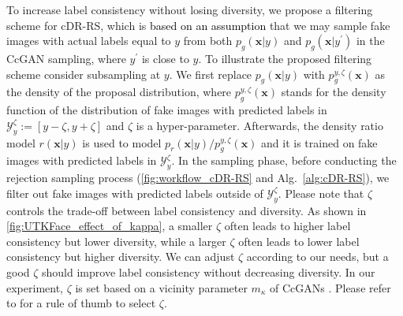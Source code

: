 \documentclass[final,12pt, 3p,times]{elsarticle}
\def\rev#1{\textcolor{black}{#1}}
\begin{document}
To increase label consistency without losing diversity, we propose a filtering scheme for cDR-RS, which is \rev{based on an assumption} that we may sample fake images with actual labels equal to $y$ from both $p_g(\bm{x}|y)$ and $p_g(\bm{x}|y^\prime)$ in the CcGAN sampling, where $y^\prime$ is close to $y$. To illustrate the proposed filtering scheme consider subsampling at $y$. We first replace $p_g(\bm{x}|y)$ with $p_g^{y, \zeta}(\bm{x})$ as the density of the proposal distribution, where $p_g^{y, \zeta}(\bm{x})$ stands for the density function of the distribution of fake images with predicted labels in $\mathcal{Y}_y^{\zeta}:=[y-\zeta, y+\zeta]$ and $\zeta$ is a hyper-parameter. Afterwards, the density ratio model $r(\bm{x}|y)$ is used to model $p_r(\bm{x}|y)/p_g^{y, \zeta}(\bm{x})$ and it is trained on fake images with predicted labels in $\mathcal{Y}_y^{\zeta}$. In the sampling phase, before conducting the rejection sampling process (\cref{fig:workflow_cDR-RS} and Alg.\ \ref{alg:cDR-RS}), we filter out fake images with predicted labels outside of $\mathcal{Y}_y^{\zeta}$. Please note that $\zeta$ controls the trade-off between label consistency and diversity. As shown in \cref{fig:UTKFace_effect_of_kappa}, a smaller $\zeta$ often leads to higher label consistency but lower diversity, while a larger $\zeta$ often leads to lower label consistency but higher diversity. We can adjust $\zeta$ according to our needs, but a good $\zeta$ should improve label consistency without decreasing diversity. In our experiment, $\zeta$ is set based on a vicinity parameter $m_{\kappa}$ of CcGANs \cite{ding2021ccgan, ding2020continuous}. Please refer to  for a rule of thumb to select $\zeta$.
\end{document}
